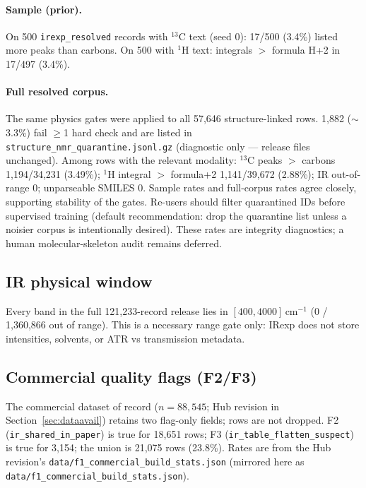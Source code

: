 \documentclass[pdflatex,sn-nature]{sn-jnl}
\begin{document}
\paragraph{Sample (prior).}
On 500 \texttt{irexp\_resolved} records with $^{13}$C text (seed 0):
17/500 (3.4\%) listed more peaks than carbons.
On 500 with $^{1}$H text: integrals $>$ formula H+2 in 17/497 (3.4\%).

\paragraph{Full resolved corpus.}
The same physics gates were applied to all 57,646 structure-linked rows.
1,882 ($\sim$3.3\%) fail $\geq$1 hard check and are listed in
\texttt{structure\_nmr\_quarantine.jsonl.gz} (diagnostic only --- release
files unchanged).
Among rows with the relevant modality: $^{13}$C peaks $>$ carbons
1,194/34,231 (3.49\%); $^{1}$H integral $>$ formula+2
1,141/39,672 (2.88\%); IR out-of-range 0; unparseable SMILES 0.
Sample rates and full-corpus rates agree closely, supporting stability of the
gates.
Re-users should filter quarantined IDs before supervised training
(default recommendation: drop the quarantine list unless a noisier corpus is
intentionally desired).
These rates are integrity diagnostics; a human molecular-skeleton audit remains
deferred.

\subsection{IR physical window}

Every band in the full 121,233-record release lies in $[400, 4000]$\,cm$^{-1}$
(0 / 1,360,866 out of range).
This is a necessary range gate only: IRexp does not store intensities, solvents,
or ATR vs transmission metadata.

\subsection{Commercial quality flags (F2/F3)}

The commercial dataset of record ($n=88{,}545$; Hub revision in
Section~\ref{sec:dataavail}) retains two flag-only fields; rows are not dropped.
F2 (\texttt{ir\_shared\_in\_paper}) is true for 18,651 rows; F3
(\texttt{ir\_table\_flatten\_suspect}) is true for 3,154; the union is 21,075
rows (23.8\%).
Rates are from the Hub revision's \texttt{data/f1\_commercial\_build\_stats.json}
(mirrored here as \texttt{data/f1\_commercial\_build\_stats.json}).
\end{document}
